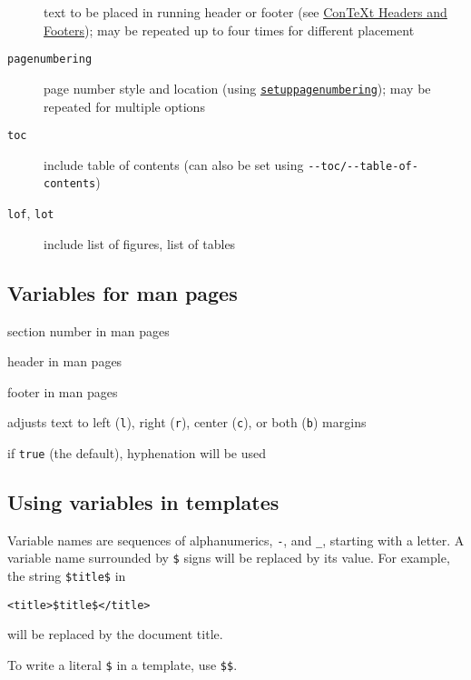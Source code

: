 \documentclass[]{article}
\providecommand{\tightlist}{%
  \setlength{\itemsep}{0pt}\setlength{\parskip}{0pt}}
\begin{document}
\begin{description}
text to be placed in running header or footer (see
\href{http://wiki.contextgarden.net/Headers_and_Footers}{ConTeXt Headers
and Footers}); may be repeated up to four times for different placement
\item[\texttt{pagenumbering}]
page number style and location (using
\href{http://wiki.contextgarden.net/Command/setuppagenumbering}{\texttt{setuppagenumbering}});
may be repeated for multiple options
\item[\texttt{toc}]
include table of contents (can also be set using
\texttt{-\/-toc/-\/-table-of-contents})
\item[\texttt{lof}, \texttt{lot}]
include list of figures, list of tables
\end{description}

\subsection{Variables for man pages}\label{variables-for-man-pages}

\begin{description}
\tightlist
\item[\texttt{section}]
section number in man pages
\item[\texttt{header}]
header in man pages
\item[\texttt{footer}]
footer in man pages
\item[\texttt{adjusting}]
adjusts text to left (\texttt{l}), right (\texttt{r}), center
(\texttt{c}), or both (\texttt{b}) margins
\item[\texttt{hyphenate}]
if \texttt{true} (the default), hyphenation will be used
\end{description}

\subsection{Using variables in
templates}\label{using-variables-in-templates}

Variable names are sequences of alphanumerics, \texttt{-}, and
\texttt{\_}, starting with a letter. A variable name surrounded by
\texttt{\$} signs will be replaced by its value. For example, the string
\texttt{\$title\$} in

\begin{verbatim}
<title>$title$</title>
\end{verbatim}

will be replaced by the document title.

To write a literal \texttt{\$} in a template, use \texttt{\$\$}.
\end{document}
